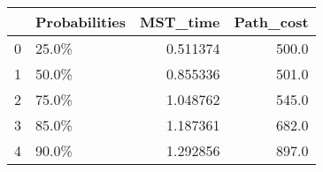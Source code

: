 \begin{tabular}{llrr}
\toprule
{} & Probabilities &  MST\_time &  Path\_cost \\
\midrule
0 &         25.0\% &  0.511374 &      500.0 \\
1 &         50.0\% &  0.855336 &      501.0 \\
2 &         75.0\% &  1.048762 &      545.0 \\
3 &         85.0\% &  1.187361 &      682.0 \\
4 &         90.0\% &  1.292856 &      897.0 \\
\bottomrule
\end{tabular}
